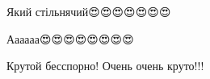  
 
 
 
 

\qqSecCmt


Який стільнячий😍😍😍😍😍😍😍

Аааааа😍😍😍😍😍😍😍😍


Крутой бесспорно! Очень очень круто!!!
